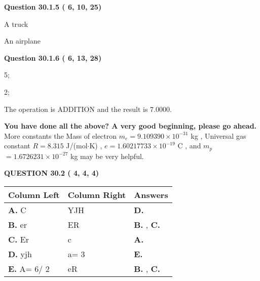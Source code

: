 \documentclass[12pt]{article}
\begin{document}
 
 
  
\vspace{0.2in}
  
{\textbf{\Large{Question
30.1.5 
 (          6,         10,         25)
}}}
  
  
 
 
\noindent{}
 
 
A truck
 
 
An airplane
 
 
 
 
  
\vspace{0.2in}
  
{\textbf{\Large{Question
30.1.6 
 (          6,         13,         28)
}}}
  
  
 
 
\noindent{}

5;
 
2;
 
The operation is  %
ADDITION and the result is
$ %
7.0000$.
 
 
 
   
   
\vspace{0.3in}
{\textbf{\LARGE{You have done all the above? A very good beginning, please go ahead.}}}
More constants the
Mass of electron
$m_e$$ =
9.109390 \times 10^{-31} $
kg
,
Universal gas constant
$R$$ =
8.315 $
J/(mol$\cdot $K)
,
$e$$ =
1.60217733 \times 10^{-19} $
C
, and
$m_p$$ =
1.6726231 \times 10^{-27} $
kg
%
may be very helpful.
\vspace{0.3in}
   
   
  
\vspace{0.2in}
  
{\textbf{\Large{QUESTION
30.2 
 (          4,          4,          4)
}}}
  
  
 
 
\noindent{}
  
  
\begin{tabular}{|l|l|l|}
 \hline
 Column Left & Column Right  & Answers       \\ 
 \hline
{\textbf{\large{
A.}}}
C
  & 
YJH
 & 
{\textbf{\large{
D.}}}
 \\ 
 \hline
{\textbf{\large{
B.}}}
er
  & 
ER
 & 
{\textbf{\large{
B.}}}
, 
{\textbf{\large{
C.}}}
 \\ 
 \hline
{\textbf{\large{
C.}}}
Er
  & 
c
 & 
{\textbf{\large{
A.}}}
 \\ 
 \hline
{\textbf{\large{
D.}}}
yjh
  & 
 a= %
3
 & 
{\textbf{\large{
E.}}}
 \\ 
 \hline
{\textbf{\large{
E.}}}
 A= %
6/ %
2

  & 
eR
 & 
{\textbf{\large{
B.}}}
, 
{\textbf{\large{
C.}}}
 \\ 
 \hline
 \end{tabular}
  
\end{document}
